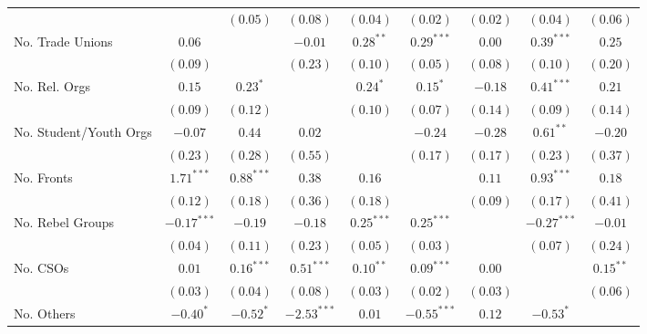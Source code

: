 \begin{table}[!htbp]
\begin{center}
{\begin{tabular}{l c c c c c c c c}
                             &                & $(0.05)$     & $(0.08)$      & $(0.04)$     & $(0.02)$      & $(0.02)$      & $(0.04)$      & $(0.06)$     \\
No. Trade Unions             & $0.06$         &              & $-0.01$       & $0.28^{**}$  & $0.29^{***}$  & $0.00$        & $0.39^{***}$  & $0.25$       \\
                             & $(0.09)$       &              & $(0.23)$      & $(0.10)$     & $(0.05)$      & $(0.08)$      & $(0.10)$      & $(0.20)$     \\
No. Rel. Orgs                & $0.15$         & $0.23^{*}$   &               & $0.24^{*}$   & $0.15^{*}$    & $-0.18$       & $0.41^{***}$  & $0.21$       \\
                             & $(0.09)$       & $(0.12)$     &               & $(0.10)$     & $(0.07)$      & $(0.14)$      & $(0.09)$      & $(0.14)$     \\
No. Student/Youth Orgs       & $-0.07$        & $0.44$       & $0.02$        &              & $-0.24$       & $-0.28$       & $0.61^{**}$   & $-0.20$      \\
                             & $(0.23)$       & $(0.28)$     & $(0.55)$      &              & $(0.17)$      & $(0.17)$      & $(0.23)$      & $(0.37)$     \\
No. Fronts                   & $1.71^{***}$   & $0.88^{***}$ & $0.38$        & $0.16$       &               & $0.11$        & $0.93^{***}$  & $0.18$       \\
                             & $(0.12)$       & $(0.18)$     & $(0.36)$      & $(0.18)$     &               & $(0.09)$      & $(0.17)$      & $(0.41)$     \\
No. Rebel Groups             & $-0.17^{***}$  & $-0.19$      & $-0.18$       & $0.25^{***}$ & $0.25^{***}$  &               & $-0.27^{***}$ & $-0.01$      \\
                             & $(0.04)$       & $(0.11)$     & $(0.23)$      & $(0.05)$     & $(0.03)$      &               & $(0.07)$      & $(0.24)$     \\
No. CSOs                     & $0.01$         & $0.16^{***}$ & $0.51^{***}$  & $0.10^{**}$  & $0.09^{***}$  & $0.00$        &               & $0.15^{**}$  \\
                             & $(0.03)$       & $(0.04)$     & $(0.08)$      & $(0.03)$     & $(0.02)$      & $(0.03)$      &               & $(0.06)$     \\
No. Others                   & $-0.40^{*}$    & $-0.52^{*}$  & $-2.53^{***}$ & $0.01$       & $-0.55^{***}$ & $0.12$        & $-0.53^{*}$   &              \\

\end{tabular}}
\end{center}
\end{table}
